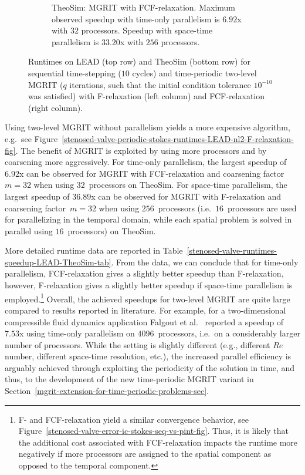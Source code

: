 \documentclass[3p]{elsarticle}
\begin{document}
\begin{figure}[ht!]
\begin{subfigure}[b]{0.475\linewidth}
\begin{tikzpicture}
\end{tikzpicture}
        \caption{TheoSim: MGRIT with FCF-relaxation.
            Maximum observed speedup with time-only parallelism is $6.92$x with $32$ processors.
            Speedup with space-time parallelism is $33.20$x with $256$ processors.}
        \label{stenosed-valve-periodic-stokes-runtimes-ASES-nl2-FCF-relaxation-fig}
    \end{subfigure}
    \caption{Runtimes on LEAD (top row) and TheoSim (bottom row) for sequential time-stepping ($10$ cycles)
        and time-periodic two-level MGRIT ($q$ iterations, such that the initial condition tolerance $10^{-10}$ was satisfied)
        with F-relaxation (left column) and FCF-relaxation (right column).}
    \label{stenosed-valve-periodic-stokes-runtimes-LEAD-ASES-nl2-F-FCF-relaxation-fig}
\end{figure}

Using two-level MGRIT without parallelism yields a more expensive algorithm,
e.g.\ see Figure~\ref{stenosed-valve-periodic-stokes-runtimes-LEAD-nl2-F-relaxation-fig}.
The benefit of MGRIT is exploited by using more processors and by coarsening more aggressively.
For time-only parallelism, the largest speedup of $6.92$x can be observed
for MGRIT with FCF-relaxation and coarsening factor~$m = 32$ when using $32$~processors on TheoSim.
For space-time parallelism, the largest speedup of $36.89$x can be observed
for MGRIT with F-relaxation and coarsening factor~$m = 32$ when using $256$~processors
(i.e.\ $16$~processors are used for parallelizing in the temporal domain,
while each spatial problem is solved in parallel using $16$~processors) on TheoSim.

More detailed runtime data are reported in Table~\ref{stenosed-valve-runtimes-speedup-LEAD-TheoSim-tab}.
From the data, we can conclude that for time-only parallelism,
FCF-relaxation gives a slightly better speedup than F-relaxation, however,
F-relaxation gives a slightly better speedup if space-time parallelism is employed.\footnote{
F- and FCF-relaxation yield a similar convergence behavior,
see Figure~\ref{stenosed-valve-error-ic-stokes-seq-vs-pint-fig}.
Thus, it is likely that the additional cost associated with FCF-relaxation impacts the runtime
more negatively if more processors are assigned to the spatial component as opposed to the temporal component.}
Overall, the achieved speedups for two-level MGRIT are quite large compared to results reported in literature.
For example, for a two-dimensional compressible fluid dynamics application
Falgout et al.~\cite{FalgoutKatzKolevSchroderWissinkYang2015} reported a speedup of $7.53$x
using time-only parallelism on $4096$~processors, i.e.\ on a considerably larger number of processors.
While the setting is slightly different (e.g., different $Re$ number, different space-time resolution, etc.),
the increased parallel efficiency is arguably achieved through exploiting the periodicity of the solution in time,
and thus, to the development of the new time-periodic MGRIT variant
in Section~\ref{mgrit-extension-for-time-periodic-problems-sec}.
\end{document}
